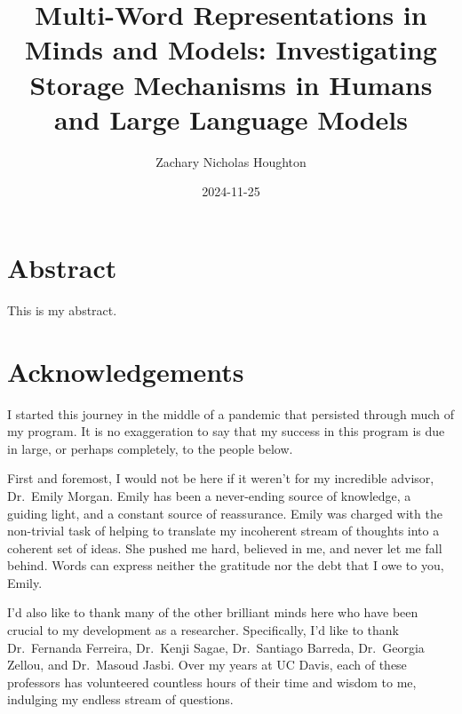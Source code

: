 \documentclass[
  letterpaper,
  DIV=11,
  numbers=noendperiod,
  nottoc]{scrreprt}
\title{Multi-Word Representations in Minds and Models: Investigating
Storage Mechanisms in Humans and Large Language Models}
\author{Zachary Nicholas Houghton}
\date{2024-11-25}
\renewcommand*\contentsname{Table of contents}
\newcommand\contentsname{Table of contents}
\begin{document}
\maketitle


\renewcommand*\contentsname{Table of contents}
{
\setcounter{tocdepth}{2}
\tableofcontents
}
\listoffigures
\listoftables


\chapter*{Abstract}\label{sec-abstract}


This is my abstract.


\chapter*{Acknowledgements}\label{sec-acknowledgements}


I started this journey in the middle of a pandemic that persisted
through much of my program. It is no exaggeration to say that my success
in this program is due in large, or perhaps completely, to the people
below.

First and foremost, I would not be here if it weren't for my incredible
advisor, Dr.~Emily Morgan. Emily has been a never-ending source of
knowledge, a guiding light, and a constant source of reassurance. Emily
was charged with the non-trivial task of helping to translate my
incoherent stream of thoughts into a coherent set of ideas. She pushed
me hard, believed in me, and never let me fall behind. Words can express
neither the gratitude nor the debt that I owe to you, Emily.

I'd also like to thank many of the other brilliant minds here who have
been crucial to my development as a researcher. Specifically, I'd like
to thank Dr.~Fernanda Ferreira, Dr.~Kenji Sagae, Dr.~Santiago Barreda,
Dr.~Georgia Zellou, and Dr.~Masoud Jasbi. Over my years at UC Davis,
each of these professors has volunteered countless hours of their time
and wisdom to me, indulging my endless stream of questions.
\end{document}
